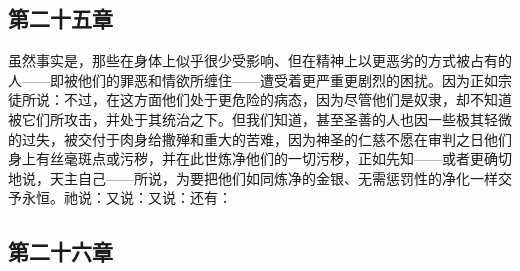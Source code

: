 \subsection{第二十五章}

\par

虽然事实是，那些在身体上似乎很少受影响、但在精神上以更恶劣的方式被占有的人——即被他们的罪恶和情欲所缠住——遭受着更严重更剧烈的困扰。因为正如宗徒所说：不过，在这方面他们处于更危险的病态，因为尽管他们是奴隶，却不知道被它们所攻击，并处于其统治之下。但我们知道，甚至圣善的人也因一些极其轻微的过失，被交付于肉身给撒殚和重大的苦难，因为神圣的仁慈不愿在审判之日他们身上有丝毫斑点或污秽，并在此世炼净他们的一切污秽，正如先知——或者更确切地说，天主自己——所说，为要把他们如同炼净的金银、无需惩罚性的净化一样交予永恒。祂说：又说：又说：还有：\par


\subsection{第二十六章}

\par

